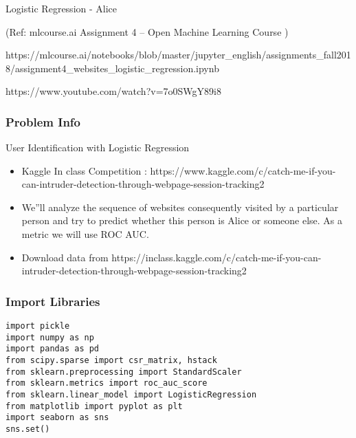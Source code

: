 \begin{frame}[fragile]\frametitle{}
\begin{center}
{\Large Logistic Regression - Alice}

{\tiny (Ref: mlcourse.ai Assignment 4 – Open Machine Learning Course ) }
\end{center}

https://mlcourse.ai/notebooks/blob/master/jupyter\_english/assignments\_fall2018/assignment4\_websites\_logistic\_regression.ipynb

https://www.youtube.com/watch?v=7o0SWgY89i8

\end{frame}


\begin{frame}[fragile]\frametitle{Problem Info}
User Identification with Logistic Regression	
\begin{itemize}
\item Kaggle In class Competition : https://www.kaggle.com/c/catch-me-if-you-can-intruder-detection-through-webpage-session-tracking2
\item We''ll analyze the sequence of websites consequently visited by a particular person and try to predict whether this person is Alice or someone else. As a metric we will use ROC AUC.
\item Download data from https://inclass.kaggle.com/c/catch-me-if-you-can-intruder-detection-through-webpage-session-tracking2
\end{itemize}
\end{frame}



\begin{frame}[fragile]\frametitle{Import Libraries}
\begin{lstlisting}
import pickle
import numpy as np
import pandas as pd
from scipy.sparse import csr_matrix, hstack
from sklearn.preprocessing import StandardScaler
from sklearn.metrics import roc_auc_score
from sklearn.linear_model import LogisticRegression
from matplotlib import pyplot as plt
import seaborn as sns
sns.set()
\end{lstlisting}
\end{frame}

